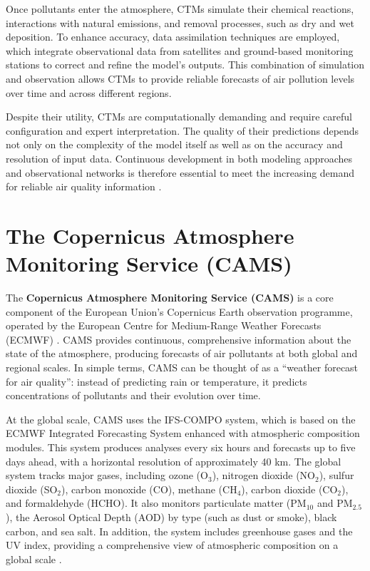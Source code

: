 Once pollutants enter the atmosphere, CTMs simulate their chemical reactions, interactions with natural emissions, and removal processes, such as dry and wet deposition. To enhance accuracy, data assimilation techniques are employed, which integrate observational data from satellites and ground-based monitoring stations to correct and refine the model’s outputs. This combination of simulation and observation allows CTMs to provide reliable forecasts of air pollution levels over time and across different regions.

Despite their utility, CTMs are computationally demanding and require careful configuration and expert interpretation. The quality of their predictions depends not only on the complexity of the model itself as well as on the accuracy and resolution of input data. Continuous development in both modeling approaches and observational networks is therefore essential to meet the increasing demand for reliable air quality information \cite{sokhi2021advances}.

\section{The Copernicus Atmosphere Monitoring Service (CAMS)}

The \textbf{Copernicus Atmosphere Monitoring Service (CAMS)} is a core component of the European Union’s Copernicus Earth observation programme, operated by the European Centre for Medium-Range Weather Forecasts (ECMWF) \cite{copernicusCopernicus, ecmwfECMWF}. CAMS provides continuous, comprehensive information about the state of the atmosphere, producing forecasts of air pollutants at both global and regional scales. In simple terms, CAMS can be thought of as a “weather forecast for air quality”: instead of predicting rain or temperature, it predicts concentrations of pollutants and their evolution over time.

At the global scale, CAMS uses the IFS-COMPO system, which is based on the ECMWF Integrated Forecasting System enhanced with atmospheric composition modules. This system produces analyses every six hours and forecasts up to five days ahead, with a horizontal resolution of approximately 40 km. The global system tracks major gases, including ozone (O$_3$), nitrogen dioxide (NO$_2$), sulfur dioxide (SO$_2$), carbon monoxide (CO), methane (CH$_4$), carbon dioxide (CO$_2$), and formaldehyde (HCHO). It also monitors particulate matter (PM$_{10}$ and PM$_{2.5}$), the Aerosol Optical Depth (AOD) by type (such as dust or smoke), black carbon, and sea salt. In addition, the system includes greenhouse gases and the UV index, providing a comprehensive view of atmospheric composition on a global scale \cite{copernicusTechnicalNote}.

